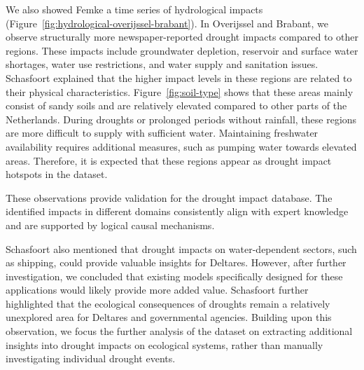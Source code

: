 We also showed Femke a time series of hydrological impacts (Figure~\ref{fig:hydrological-overijssel-brabant}). In Overijssel and Brabant, we observe structurally more newspaper-reported drought impacts compared to other regions. These impacts include groundwater depletion, reservoir and surface water shortages, water use restrictions, and water supply and sanitation issues. Schasfoort explained that the higher impact levels in these regions are related to their physical characteristics. Figure~\ref{fig:soil-type} shows that these areas mainly consist of sandy soils and are relatively elevated compared to other parts of the Netherlands. During droughts or prolonged periods without rainfall, these regions are more difficult to supply with sufficient water. Maintaining freshwater availability requires additional measures, such as pumping water towards elevated areas. Therefore, it is expected that these regions appear as drought impact hotspots in the dataset.

These observations provide validation for the drought impact database. The identified impacts in different domains consistently align with expert knowledge and are supported by logical causal mechanisms.

Schasfoort also mentioned that drought impacts on water-dependent sectors, such as shipping, could provide valuable insights for Deltares. However, after further investigation, we concluded that existing models specifically designed for these applications would likely provide more added value. Schasfoort further highlighted that the ecological consequences of droughts remain a relatively unexplored area for Deltares and governmental agencies. Building upon this observation, we focus the further analysis of the dataset on extracting additional insights into drought impacts on ecological systems, rather than manually investigating individual drought events.